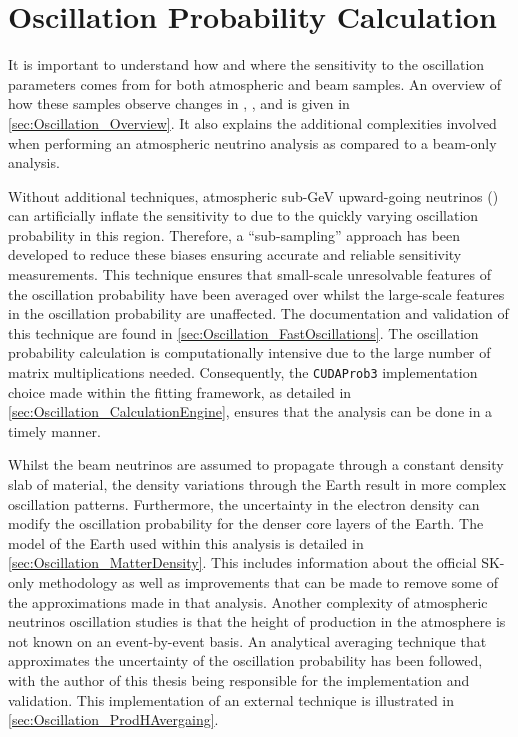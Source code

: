 \chapter{Oscillation Probability Calculation}
\label{chap:OscillationProbability}

It is important to understand how and where the sensitivity to the oscillation parameters comes from for both atmospheric and beam samples. An overview of how these samples observe changes in \dcp, \delmsqatm, and \sinsqatm is given in \autoref{sec:Oscillation_Overview}. It also explains the additional complexities involved when performing an atmospheric neutrino analysis as compared to a beam-only analysis.

Without additional techniques, atmospheric sub-GeV upward-going neutrinos () can artificially inflate the sensitivity to \dcp due to the quickly varying oscillation probability in this region. Therefore, a ``sub-sampling'' approach has been developed to reduce these biases ensuring accurate and reliable sensitivity measurements. This technique ensures that small-scale unresolvable features of the oscillation probability have been averaged over whilst the large-scale features in the oscillation probability are unaffected. The documentation and validation of this technique are found in \autoref{sec:Oscillation_FastOscillations}. The oscillation probability calculation is computationally intensive due to the large number of matrix multiplications needed. Consequently, the \texttt{CUDAProb3} implementation choice made within the fitting framework, as detailed in \autoref{sec:Oscillation_CalculationEngine}, ensures that the analysis can be done in a timely manner.

Whilst the beam neutrinos are assumed to propagate through a constant density slab of material, the density variations through the Earth result in more complex oscillation patterns. Furthermore, the uncertainty in the electron density can modify the oscillation probability for the denser core layers of the Earth. The model of the Earth used within this analysis is detailed in \autoref{sec:Oscillation_MatterDensity}. This includes information about the official SK-only methodology as well as improvements that can be made to remove some of the approximations made in that analysis. Another complexity of atmospheric neutrinos oscillation studies is that the height of production in the atmosphere is not known on an event-by-event basis. An analytical averaging technique that approximates the uncertainty of the oscillation probability has been followed, with the author of this thesis being responsible for the implementation and validation. This implementation of an external technique is illustrated in \autoref{sec:Oscillation_ProdHAvergaing}.

